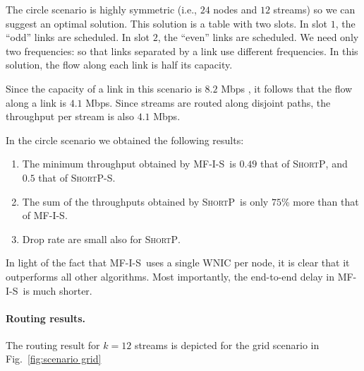 \documentclass[12pt,oneside,english,a4paper]{book}
\theoremstyle{plain}
\theoremstyle{definition}
\theoremstyle{Theorem}
\theoremstyle{plain}
\newenvironment{proof sketch}[1]{\noindent {\emph{Proof sketch of #1:}}}{\hfill \qed}
\newcommand{\algA}{\textsc{MF-I-S}}
\newcommand{\algB}{\textsc{ShortP}}
\newcommand{\algBS}{\textsc{ShortP-S}}
\begin{document}
The circle scenario is highly symmetric (i.e., $24$ nodes and $12$
streams) so we can suggest an optimal solution.  This solution is a
table with two slots.  In slot $1$, the ``odd'' links are scheduled.
In slot $2$, the ``even'' links are scheduled.  We need only two
frequencies: so that links separated by a link use different
frequencies.
In this solution, the flow along each link is half its capacity.

Since the capacity of a link in this scenario is $8.2$ Mbps , it follows that
the flow along a link is $4.1$ Mbps. Since streams are routed along
disjoint paths, the throughput per stream is also $4.1$ Mbps.

In the circle scenario we obtained the following results:
\begin{enumerate}[(1)]
\item The minimum throughput obtained by \algA\ is $0.49$ that of \algB, and $0.5$ that of \algBS.
\item The sum of the throughputs obtained by \algB\ is only $75$\% more than that of
  \algA.
\item Drop rate are small also for \algB.
\end{enumerate}

In light of the fact that \algA\ uses a single WNIC per node, it is
clear that it outperforms all other algorithms. Most importantly, the
end-to-end delay in \algA\ is much shorter.

  


\paragraph{Routing results.}
The routing result for $k=12$ streams is depicted for the grid
scenario in Fig.~\ref{fig:scenario grid}
\end{document}
